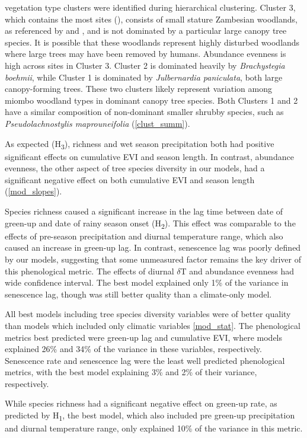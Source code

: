\documentclass[11pt,a4paper]{article}
\begin{document}
\nCluster{} vegetation type clusters were identified during hierarchical
clustering. Cluster 3, which contains the most sites (\nClusterC{}), consists of
small stature Zambesian woodlands, as referenced by \citet{Dinerstein2017} and
\citet{Chidumayo2001}, and is not dominated by a particular large canopy tree
species. It is possible that these woodlands represent highly disturbed
woodlands where large trees may have been removed by humans. Abundance evenness
is high across sites in Cluster 3. Cluster 2 is dominated heavily by
\textit{Brachystegia boehmii}, while Cluster 1 is dominated by
\textit{Julbernardia paniculata}, both large canopy-forming trees. These two
clusters likely represent variation among miombo woodland types in dominant
canopy tree species. Both Clusters 1 and 2 have a similar composition of
non-dominant smaller shrubby species, such as \textit{Pseudolachnostylis
maprouneifolia} (\autoref{clust_summ}).

As expected (H\textsubscript{3}), richness and wet season precipitation both had
positive significant effects on cumulative EVI and season length. In contrast,
abundance evenness, the other aspect of tree species diversity in our models,
had a significant negative effect on both cumulative EVI and season length
(\autoref{mod_slopes}).

Species richness caused a significant increase in the lag time between date of
green-up and date of rainy season onset (H\textsubscript{2}). This effect was
comparable to the effects of pre-season precipitation and diurnal temperature
range, which also caused an increase in green-up lag. In contrast, senescence
lag was poorly defined by our models, suggesting that some unmeasured factor
remains the key driver of this phenological metric. The effects of diurnal
$\delta$T and abundance evenness had wide confidence interval. The best model
explained only 1\% of the variance in senescence lag, though was still better
quality than a climate-only model.

All best models including tree species diversity variables were of better
quality than models which included only climatic variables \autoref{mod_stat}.
The phenological metrics best predicted were green-up lag and cumulative EVI,
where models explained 26\% and 34\% of the variance in these variables,
respectively. Senescence rate and senescence lag were the least well predicted
phenological metrics, with the best model explaining 3\% and 2\% of their
variance, respectively.

While species richness had a significant negative effect on green-up rate, as
predicted by H\textsubscript{1}, the best model, which also included pre
green-up precipitation and diurnal temperature range, only explained 10\% of the
variance in this metric. 
\end{document}
